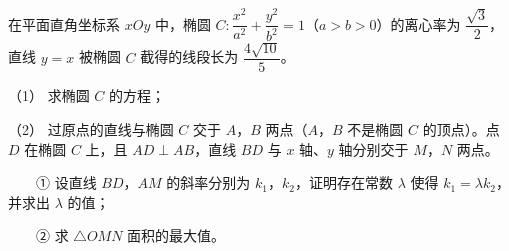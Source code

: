 \begin{question}
在平面直角坐标系 $xOy$ 中，椭圆 $C:\dfrac{x^2}{a^2}+\dfrac{y^2}{b^2}=1$（$a>b>0$）的离心率为 $\dfrac{\sqrt3}2$，直线 $y=x$ 被椭圆 $C$ 截得的线段长为 $\dfrac{4\sqrt{10}}5$。

（1） 求椭圆 $C$ 的方程；

（2） 过原点的直线与椭圆 $C$ 交于 $A$，$B$ 两点（$A$，$B$ 不是椭圆 $C$ 的顶点）。点 $D$ 在椭圆 $C$ 上，且 $AD\perp AB$，直线 $BD$ 与 $x$ 轴、$y$ 轴分别交于 $M$，$N$ 两点。

　　① 设直线 $BD$，$AM$ 的斜率分别为 $k_1$，$k_2$，证明存在常数 $\lambda$ 使得 $k_1=\lambda k_2$，并求出 $\lambda$ 的值；

　　② 求 $\triangle OMN$ 面积的最大值。

\end{question}